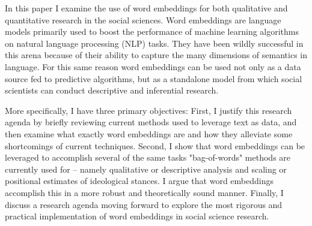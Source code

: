 \documentclass[../embeddings.tex]{subfiles}
\begin{document}
In this paper I examine the use of word embeddings for both qualitative and quantitative research in the social sciences. Word embeddings are language models primarily used to boost the performance of machine learning algorithms on natural language processing (NLP) tasks. They have been wildly successful in this arena because of their ability to capture the many dimensions of semantics in language. For this same reason word embeddings can be used not only as a data source fed to predictive algorithms, but as a standalone model from which social scientists can conduct descriptive and inferential research. 

More specifically, I have three primary objectives: First, I justify this research agenda by briefly reviewing current methods used to leverage text as data, and then examine what exactly word embeddings are and how they alleviate some shortcomings of current techniques. Second, I show that word embeddings can be leveraged to accomplish several of the same tasks "bag-of-words" methods are currently used for – namely qualitative or descriptive analysis and scaling or positional estimates of ideological stances. I argue that word embeddings accomplish this in a more robust and theoretically sound manner. Finally, I discuss a research agenda moving forward to explore the most rigorous and practical implementation of word embeddings in social science research.
\end{document}
